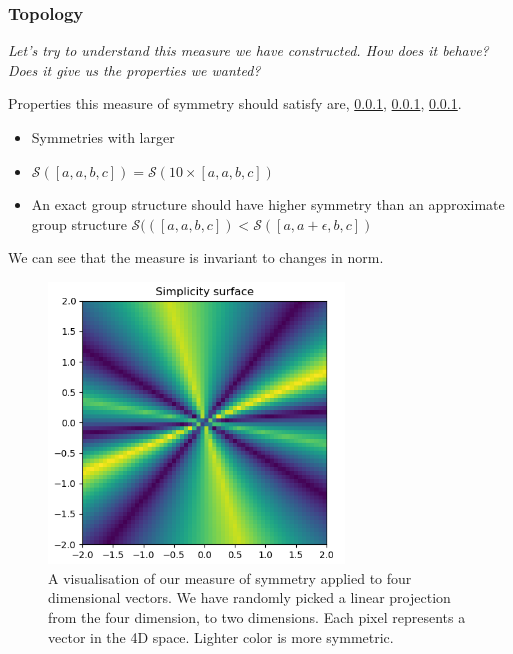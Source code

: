 \subsubsection{Topology}

\begin{displayquote}
\textsl{Let's try to understand this measure we have constructed. How does it behave?
Does it give us the properties we wanted?}
\end{displayquote}

Properties this measure of symmetry should satisfy are, \ref{}, \ref{}, \ref{}.

\begin{itemize}
	\tightlist
	\item Symmetries with larger
	\item $\mathcal S([a,a,b,c]) = \mathcal S(10 \times [a,a,b,c])$
	\item An exact group structure should have higher symmetry than an approximate group structure $\mathcal S(([a,a,b,c]) < \mathcal S([a,a+\epsilon,b,c])$
\end{itemize}

We can see that the measure is invariant to changes in norm.


\begin{figure}[h!]
\centering
\includegraphics[width=0.7\textwidth,height=0.35\textheight]{../../pictures/figures/complexity_surface_nd-3d.png}
\caption{A visualisation of our measure of symmetry applied to four dimensional vectors.
We have randomly picked a linear projection from the four dimension, to two dimensions.
Each pixel represents a vector in the 4D space. Lighter color is more symmetric.}
\end{figure}

